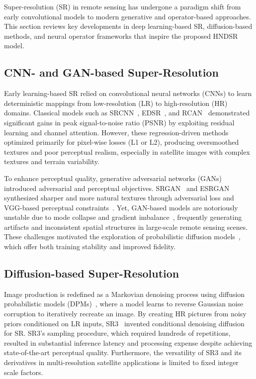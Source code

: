 \documentclass[conference]{IEEEtran}
\begin{document}
Super-resolution (SR) in remote sensing has undergone a paradigm shift from early convolutional models to modern generative and operator-based approaches. This section reviews key developments in deep learning-based SR, diffusion-based methods, and neural operator frameworks that inspire the proposed HNDSR model.

\subsection{CNN- and GAN-based Super-Resolution}

Early learning-based SR relied on convolutional neural networks (CNNs) to learn deterministic mappings from low-resolution (LR) to high-resolution (HR) domains. Classical models such as SRCNN~\cite{dong2015image}, EDSR~\cite{lim2017enhanced}, and RCAN~\cite{zhang2018image} demonstrated significant gains in peak signal-to-noise ratio (PSNR) by exploiting residual learning and channel attention. However, these regression-driven methods optimized primarily for pixel-wise losses (L1 or L2), producing oversmoothed textures and poor perceptual realism, especially in satellite images with complex textures and terrain variability.

To enhance perceptual quality, generative adversarial networks (GANs) introduced adversarial and perceptual objectives. SRGAN~\cite{ledig2017photo} and ESRGAN~\cite{wang2018esrgan} synthesized sharper and more natural textures through adversarial loss and VGG-based perceptual constraints~\cite{johnson2016perceptual}. Yet, GAN-based models are notoriously unstable due to mode collapse and gradient imbalance~\cite{arjovsky2017towards}, frequently generating artifacts and inconsistent spatial structures in large-scale remote sensing scenes. These challenges motivated the exploration of probabilistic diffusion models~\cite{ho2020denoising}, which offer both training stability and improved fidelity.

\subsection{Diffusion-based Super-Resolution}

Image production is redefined as a Markovian denoising process using diffusion probabilistic models (DPMs)~\cite{sohl2015deep, ho2020denoising}, where a model learns to reverse Gaussian noise corruption to iteratively recreate an image.  By creating HR pictures from noisy priors conditioned on LR inputs, SR3~\cite{saharia2022image} invented conditional denoising diffusion for SR.  SR3's sampling procedure, which required hundreds of repetitions, resulted in substantial inference latency and processing expense despite achieving state-of-the-art perceptual quality.  Furthermore, the versatility of SR3 and its derivatives in multi-resolution satellite applications is limited to fixed integer scale factors.
\end{document}
